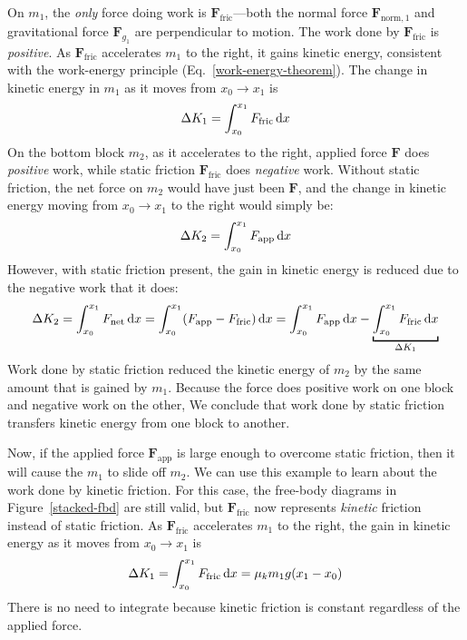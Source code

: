 On $m_1$, the \emph{only} force doing work is $\bm F_\text{fric}$---both the
normal force $\bm F_{\text{norm},1}$ and gravitational force $\bm F_{g_1}$ are
perpendicular to motion. The work done by $\bm F_\text{fric}$ is
\emph{positive}. As $\bm F_\text{fric}$ accelerates $m_1$ to the right, it gains
kinetic energy, consistent with the work-energy principle
(Eq.~\ref{work-energy-theorem}). The change in kinetic energy in $m_1$ as it
moves from $x_0\to x_1$ is
\begin{equation*}
  \Delta K_1=\int_{x_0}^{x_1}F_\text{fric}\dl x
\end{equation*}
On the bottom block $m_2$, as it accelerates to the right, applied force $\bm F$
does \emph{positive} work, while static friction $\bm F_\text{fric}$ does
\emph{negative} work.
Without static friction, the net force on $m_2$ would have just been $\bm F$,
and the change in kinetic energy moving from $x_0\to x_1$ to the right would
simply be:
\begin{equation*}
  \Delta K_2 = \int_{x_0}^{x_1} F_\text{app}\dl x
\end{equation*}
However, with static friction present, the gain in kinetic energy is reduced
due to the negative work that it does:
\begin{equation*}
  \Delta K_2 = \int_{x_0}^{x_1} F_\text{net}\dl x =
  \int_{x_0}^{x_1} (F_\text{app}-F_\text{fric})\dl x =
  \int_{x_0}^{x_1} F_\text{app}\dl x -
  \underbracket[1pt]{\int_{x_0}^{x_1} F_\text{fric}\dl x}_{\Delta K_1}
\end{equation*}
Work done by static friction reduced the kinetic energy of $m_2$ by the same
amount that is gained by $m_1$. Because the force does positive work on one
block and negative work on the other, We conclude that work done by static
friction transfers kinetic energy from one block to another.

Now, if the applied force $\bm F_\text{app}$ is large enough to overcome static
friction, then it will cause the $m_1$ to slide off $m_2$. We can use this
example to learn about the work done by kinetic friction. For this case, the
free-body diagrams in Figure~\ref{stacked-fbd} are still valid, but
$\bm F_\text{fric}$ now represents \emph{kinetic} friction instead of static
friction. As $\bm F_\text{fric}$ accelerates $m_1$ to the right, the gain in
kinetic energy as it moves from $x_0\to x_1$ is
\begin{equation*}
  \Delta K_1=\int_{x_0}^{x_1}F_\text{fric}\dl x=\mu_km_1g(x_1-x_0)
\end{equation*}
There is no need to integrate because kinetic friction is constant regardless
of the applied force.

